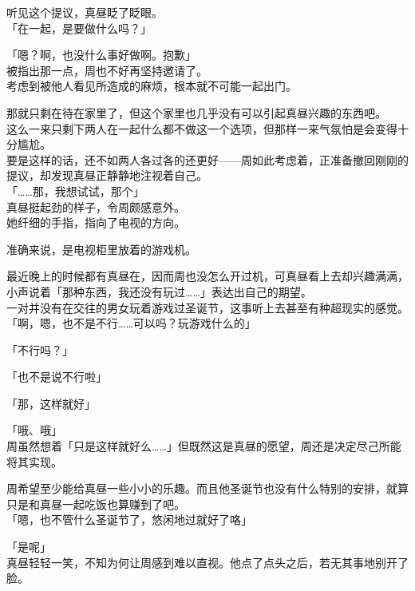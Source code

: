 听见这个提议，真昼眨了眨眼。\\

「在一起，是要做什么吗？」

「嗯？啊，也没什么事好做啊。抱歉」\\

被指出那一点，周也不好再坚持邀请了。\\

考虑到被他人看见所造成的麻烦，根本就不可能一起出门。

那就只剩在待在家里了，但这个家里也几乎没有可以引起真昼兴趣的东西吧。\\

这么一来只剩下两人在一起什么都不做这一个选项，但那样一来气氛怕是会变得十分尴尬。\\

要是这样的话，还不如两人各过各的还更好——周如此考虑着，正准备撤回刚刚的提议，却发现真昼正静静地注视着自己。\\

「……那，我想试试，那个」\\

真昼挺起劲的样子，令周颇感意外。\\

她纤细的手指，指向了电视的方向。

准确来说，是电视柜里放着的游戏机。

最近晚上的时候都有真昼在，因而周也没怎么开过机，可真昼看上去却兴趣满满，小声说着「那种东西，我还没有玩过……」表达出自己的期望。\\

一对并没有在交往的男女玩着游戏过圣诞节，这事听上去甚至有种超现实的感觉。\\

「啊，嗯，也不是不行……可以吗？玩游戏什么的」

「不行吗？」

「也不是说不行啦」

「那，这样就好」

「哦、哦」\\

周虽然想着「只是这样就好么……」但既然这是真昼的愿望，周还是决定尽己所能将其实现。

周希望至少能给真昼一些小小的乐趣。而且他圣诞节也没有什么特别的安排，就算只是和真昼一起吃饭也算赚到了吧。\\

「嗯，也不管什么圣诞节了，悠闲地过就好了咯」

「是呢」\\

真昼轻轻一笑，不知为何让周感到难以直视。他点了点头之后，若无其事地别开了脸。
